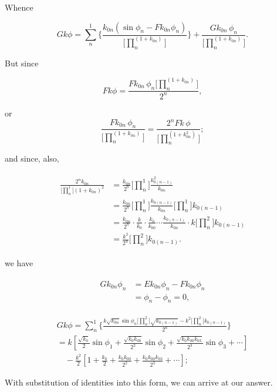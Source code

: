 \documentclass[12pt,letterpaper]{article}
\begin{document}
	Whence
	
	\begin{equation}
		Gk\phi = \sum_{n}^{1} 
		\Biggl\{ \frac{k_{0n}(\sin \phi_{n} - Fk_{0n}\phi_{n})}
		{\bigl[\prod_{n}^{(1 + k_{0n})}\bigr]} \Biggr\}
		+ \frac{Gk_{0n}\, \phi_{n}}{\bigl[\prod_{n}^{(1 + k_{0n})}\bigr]}.
	\end{equation}
	
	But since
	
	\begin{equation*}
		Fk\phi = \frac{Fk_{0n}\, \phi_{n}\bigl[\prod_{n}^{(1 + k_{0n})}\bigr]}{2^{n}},
	\end{equation*}
	
	or
	\begin{equation*}
		\frac{Fk_{0n}\, \phi_{n}}{\bigl[\prod_{n}^{(1 + k_{0n})}\bigr]} = \frac{2^{n} Fk\, \phi}{\bigl[\prod_{n}^{(1 + k_{0n}^2)}\bigr]};
	\end{equation*}
	
	and since, also,
	
	\begin{align}
		\begin{split}
			\frac{2^{n}k_{0n}}{ \bigl[\prod_{n}^{1}\bigr] \left(1+k_{0n}\right)^2}
			&= \frac{k_{0n}}{2^n}\bigl[\prod_{n}^{1}\bigr] \frac{k^{2}_{0\left(n-1\right)}}{k_{0n}} \\
			&= \frac{k_{0n}}{2^n}\bigl[\prod_{n}^{1}\bigr] \frac{k_{0\left(n-1\right)}}{k_{0n}} \bigl[\prod_{n}^{1}\bigr] k_{0\left(n-1\right)} \\
			&= \frac{k_{0n}}{2^n} \cdot \frac{k}{k_0} \cdot \frac{k_0}{k_{00}} \dotsm \frac{k_{0\left(n-1\right)}}{k_{0n}} \cdot k\bigl[\prod_{n}^{2}\bigr] k_{0\left(n-1\right)} \\
			& = \frac{k^2}{2^n} \bigl[\prod_{n}^{2}\bigr] k_{0\left(n-1\right)}.
		\end{split}
	\end{align}
	
	we have
	
	\begin{align*}
		\begin{split}
			Gk_{0n}\phi_n &= Ek_{0n}\phi_n - Fk_{0n}\phi_n \\
			&= \phi_n - \phi_n = 0, 
		\end{split}
	\end{align*}
	
	\begin{multline}
		Gk\phi = \sum_{n}^{1} \Biggl\{ \frac{k\sqrt{k_{0n}} \sin \phi_{n} \bigl[\prod_{n}^{2}\bigr] \sqrt{k_{0(n-1)}} - k^{2} \bigl[\prod_{n}^{2}\bigr] k_{0(n-1)}}{2^{n}} \Biggr\} \\
		= k \left[\frac{\sqrt{k_{0}}}{2} \sin \phi_{1} + \frac{\sqrt{k_{0}k_{00}}}{2^{2}} \sin \phi_{2} + \frac{\sqrt{k_{0}k_{00}k_{03}}}{2^{3}} \sin \phi_{3} + \dotsb\right] \\
		 \quad - \frac{k^{2}}{2} \left[1 + \frac{k_{0}}{2} + \frac{k_{0}k_{00}}{2^{2}} + \frac{k_{0}k_{00}k_{03}}{2^{3}} + \dotsb\right];
	\end{multline}
	
	With substitution of identities into this form, we can arrive at our answer.
\end{document}
